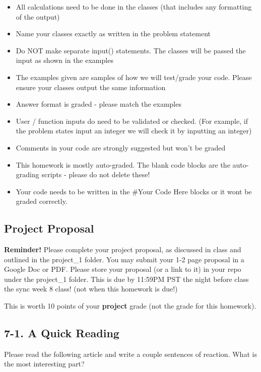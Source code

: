 \documentclass[11pt]{article}
\providecommand{\tightlist}{%
      \setlength{\itemsep}{0pt}\setlength{\parskip}{0pt}}
\begin{document}
\begin{itemize}
\tightlist
\item
  All calculations need to be done in the classes (that includes any
  formatting of the output)
\item
  Name your classes exactly as written in the problem statement
\item
  Do NOT make separate input() statements. The classes will be passed
  the input as shown in the examples
\item
  The examples given are samples of how we will test/grade your code.
  Please ensure your classes output the same information
\item
  Answer format is graded - please match the examples
\item
  User / function inputs do need to be validated or checked. (For
  example, if the problem states input an integer we will check it by
  inputting an integer)
\item
  Comments in your code are strongly suggested but won't be graded
\item
  This homework is mostly auto-graded. The blank code blocks are the
  auto-grading scripts - please do not delete these!
\item
  Your code needs to be written in the \#Your Code Here blocks or it
  wont be graded correctly.
\end{itemize}

    \subsection{Project Proposal}\label{project-proposal}

\textbf{Reminder!} Please complete your project proposal, as discussed
in class and outlined in the project\_1 folder. You may submit your 1-2
page proposal in a Google Doc or PDF. Please store your proposal (or a
link to it) in your repo under the project\_1 folder. This is due by
11:59PM PST the night before class the sync week 8 class! (not when this
homework is due!)

This is worth 10 points of your \textbf{project} grade (not the grade
for this homework).

    \subsection{7-1. A Quick Reading}\label{a-quick-reading}

Please read the following article and write a couple sentences of
reaction. What is the most interesting part?
\end{document}
